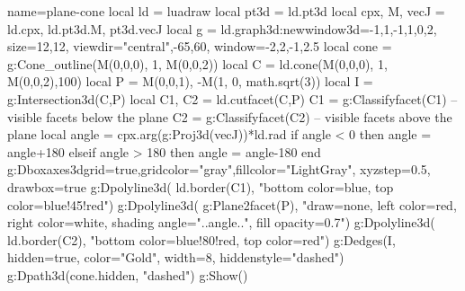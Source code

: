 \documentclass{standalone} %
\begin{document}
\begin{luadraw}{name=plane-cone}
local ld = luadraw
local pt3d = ld.pt3d
local cpx, M, vecJ = ld.cpx, ld.pt3d.M, pt3d.vecJ
local g = ld.graph3d:new{window3d={-1,1,-1,1,0,2}, size={12,12}, 
    viewdir={"central",-65,60}, window={-2,2,-1,2.5} }
local cone = g:Cone_outline(M(0,0,0), 1, M(0,0,2))
local C = ld.cone(M(0,0,0), 1, M(0,0,2),100)
local P = {M(0,0,1), -M(1, 0, math.sqrt(3))}
local I = g:Intersection3d(C,P)
local C1, C2 = ld.cutfacet(C,P)
C1 = g:Classifyfacet(C1) -- visible facets below the plane
C2 = g:Classifyfacet(C2) -- visible facets  above the plane
local angle = cpx.arg(g:Proj3d(vecJ))*ld.rad
if angle < 0 then angle = angle+180
    elseif angle > 180 then angle = angle-180 
end 
g:Dboxaxes3d{grid=true,gridcolor="gray",fillcolor="LightGray", xyzstep=0.5, drawbox=true}
g:Dpolyline3d( ld.border(C1), "bottom color=blue, top color=blue!45!red")
g:Dpolyline3d( g:Plane2facet(P), "draw=none, left color=red, right color=white, shading angle="..angle..", fill opacity=0.7")
g:Dpolyline3d( ld.border(C2), "bottom color=blue!80!red, top color=red")
g:Dedges(I, {hidden=true, color="Gold", width=8, hiddenstyle="dashed"})
g:Dpath3d(cone.hidden, "dashed")
g:Show()
\end{luadraw}
\end{document}
